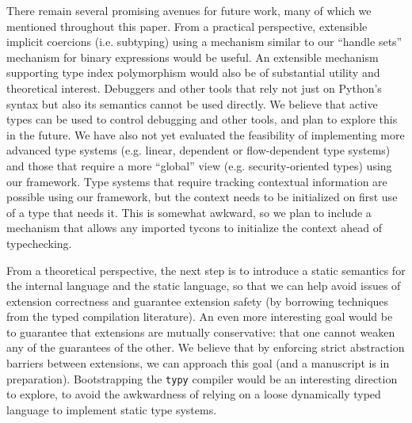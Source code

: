 \documentclass[preprint,10pt]{sigplanconf}
\begin{document}
There remain several promising avenues for future work, many of which we mentioned throughout this paper. From a practical perspective, extensible implicit coercions (i.e. subtyping) using a mechanism similar to our ``handle sets'' mechanism for binary expressions would be useful. An extensible mechanism supporting type index polymorphism would also be of substantial utility and theoretical interest. Debuggers and other tools that rely not just on Python's syntax but also its semantics cannot be used directly. We believe that active types can be used to control debugging and other tools, and plan to explore this in the future. We have also not yet evaluated the feasibility of implementing more advanced type systems (e.g. linear, dependent or flow-dependent type systems) and those that require a more ``global'' view (e.g. security-oriented types) using our framework. Type systems that require tracking contextual information are possible using our framework, but the context needs to be initialized on first use of a type that needs it. This is somewhat awkward, so we plan to include a mechanism that allows any imported tycons to initialize the context ahead of typechecking.

From a theoretical perspective, the next step is to introduce a static semantics for the internal language and the static language, so that we can help avoid issues of extension correctness and guarantee extension safety (by borrowing techniques from the typed compilation literature). An even more interesting goal would be to guarantee that extensions are mutually conservative: that one cannot weaken any of the guarantees of the other. We believe that by enforcing strict abstraction barriers between extensions, we can approach this goal (and a manuscript is in preparation). Bootstrapping the \texttt{typy} compiler would be an interesting direction to explore, to avoid the awkwardness of relying on a loose dynamically typed language to implement static type systems.
% 
\end{document}

